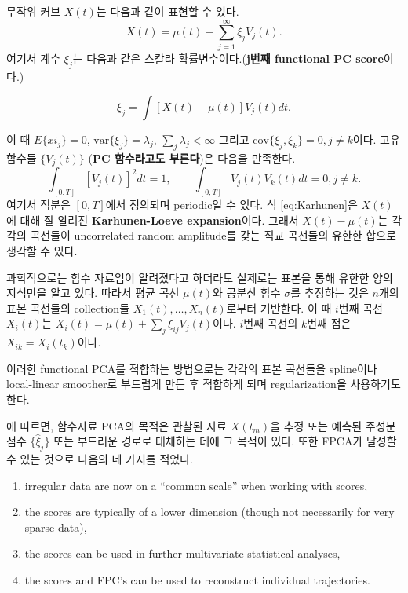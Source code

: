 \documentclass[b5paper,]{scrbook}
\theoremstyle{plain}
\theoremstyle{definition}
\numberwithin{equation}{section}
\begin{document}
무작위 커브 \(X(t)\)는 다음과 같이 표현할 수 있다.
\[X(t)=\mu(t) + \sum_{j=1}^{\infty}\xi_{j}V_{j}(t).\]
여기서 계수 \(\xi_{j}\)는 다음과 같은 스칼라 확률변수이다.(\textbf{j번째 functional PC score}이다.)

\begin{equation}
\xi_{j} =\int [X(t)-\mu(t)]V_{j}(t)dt.
\label{eq:Karhunen}
\end{equation}

이 때 \(E\{xi_{j}\}=0\), \(\text{var}\{\xi_{j}\}=\lambda_{j}\), \(\sum_{j}\lambda_{j}<\infty\) 그리고 \(\text{cov}\{\xi_{j},\xi_{k}\}=0,j\neq k\)이다. 고유함수들 \(\{V_{j}(t) \}\) (\textbf{PC 함수라고도 부른다})은 다음을 만족한다.
\[\int_{[0,T]} [V_{j}(t)]^{2}dt=1, \qquad{\int_{[0,T]} V_{j}(t)V_{k}(t)dt=0, j\neq k. }\]
여기서 적분은 \([0,T]\)에서 정의되며 periodic일 수 있다. 식 \eqref{eq:Karhunen}은 \(X(t)\)에 대해 잘 알려진 \textbf{Karhunen-Loeve expansion}이다. 그래서 \(X(t)-\mu(t)\)는 각각의 곡선들이 uncorrelated random amplitude를 갖는 직교 곡선들의 유한한 합으로 생각할 수 있다.

과학적으로는 함수 자료임이 알려졌다고 하더라도 실제로는 표본을 통해 유한한 양의 지식만을 알고 있다. 따라서 평균 곡선 \(\mu(t)\)와 공분산 함수 \(\sigma\)를 추정하는 것은 \(n\)개의 표본 곡선들의 collection들 \(X_{1}(t),\ldots, X_{n}(t)\)로부터 기반한다. 이 때 \(i\)번째 곡선 \(X_{i}(t)\)는 \(X_{i}(t)=\mu(t)+\sum_{j}\xi_{ij}V_{j}(t)\)이다. \(i\)번째 곡선의 \(k\)번째 점은 \(X_{ik}=X_{i}(t_{k})\)이다.

이러한 functional PCA를 적합하는 방법으로는 각각의 표본 곡선들을 spline이나 local-linear smoother로 부드럽게 만든 후 적합하게 되며 regularization을 사용하기도 한다.

\citep{Kokoszka2017}에 따르면, 함수자료 PCA의 목적은 관찰된 자료 \(X(t_{m})\)을 추정 또는 예측된 주성분 점수 \(\{\hat{\xi}_{j} \}\) 또는 부드러운 경로로 대체하는 데에 그 목적이 있다. 또한 FPCA가 달성할 수 있는 것으로 다음의 네 가지를 적었다.

\begin{enumerate}
\def\labelenumi{\arabic{enumi}.}
\item
  irregular data are now on a ``common scale'' when working with scores,
\item
  the scores are typically of a lower dimension (though not necessarily for very sparse data),
\item
  the scores can be used in further multivariate statistical analyses,
\item
  the scores and FPC's can be used to reconstruct individual trajectories.
\end{enumerate}
\end{document}
